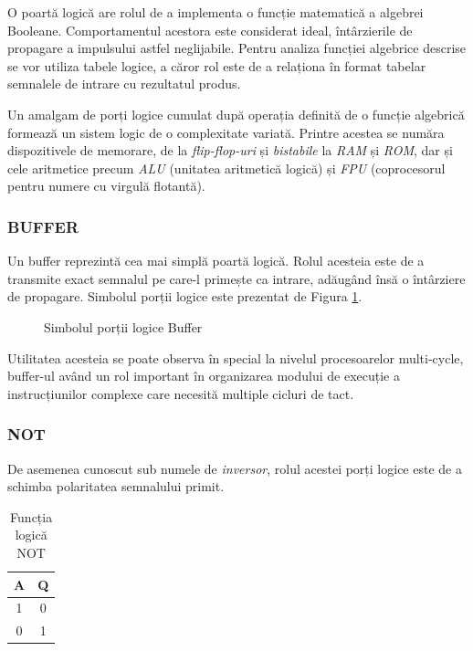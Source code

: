 \documentclass[12pt]{article}
\begin{document}
O poartă logică are rolul de a implementa o funcție matematică a algebrei Booleane. Comportamentul acestora este considerat ideal, întârzierile de propagare a impulsului astfel neglijabile. Pentru analiza funcției algebrice descrise se vor utiliza  tabele logice, a căror rol este de a relaționa în format tabelar semnalele de intrare cu rezultatul produs.

Un amalgam de porți logice cumulat după operația definită de o funcție algebrică formează un sistem logic de o complexitate variată. Printre acestea se număra dispozitivele de memorare, de la \textit{flip-flop-uri} și \textit{bistabile} la \textit{RAM} și \textit{ROM}, dar și cele aritmetice precum \textit{ALU} (unitatea aritmetică logică) și \textit{FPU} (coprocesorul pentru numere cu virgulă flotantă).


\subsubsection{BUFFER}
Un buffer reprezintă cea mai simplă poartă logică. Rolul acesteia este de a transmite exact semnalul pe care-l primește ca intrare, adăugând însă o întârziere de propagare. Simbolul porții logice este prezentat de Figura \ref{Figura:4}.

 \begin{figure}[h!]
 \centering
 \caption{Simbolul porții logice Buffer}
 \label{Figura:4}
\end{figure}
 
 Utilitatea acesteia se poate observa în special la nivelul procesoarelor  multi-cycle, buffer-ul având un rol important în organizarea modului de execuție a instrucțiunilor complexe care necesită multiple cicluri de tact. 
 
\subsubsection{NOT}
De asemenea cunoscut sub numele de \textit{inversor}, rolul acestei porți logice este 
de a schimba polaritatea semnalului primit.
 
 \begin{table}[h]
\centering
\caption{Funcția logică NOT}
\label{Tabela:7}
\begin{tabular}{ ||c|c|| }
 \hline
 A & Q\\ 
 \hline  \hline
 1 & 0 \\
 \hline
 0 & 1 \\
 \hline
\end{tabular}
\end{table}
\end{document}
